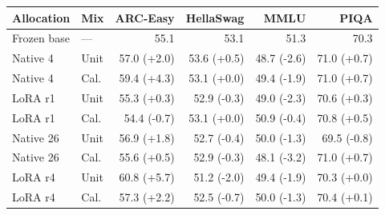 \begin{tabular}{@{}llrrrr@{}}
\toprule
Allocation & Mix & ARC-Easy & HellaSwag & MMLU & PIQA\\
\midrule
Frozen base & --- & 55.1 & 53.1 & 51.3 & 70.3\\
Native 4 & Unit & 57.0 (+2.0) & 53.6 (+0.5) & 48.7 (-2.6) & 71.0 (+0.7)\\
Native 4 & Cal. & 59.4 (+4.3) & 53.1 (+0.0) & 49.4 (-1.9) & 71.0 (+0.7)\\
LoRA r1 & Unit & 55.3 (+0.3) & 52.9 (-0.3) & 49.0 (-2.3) & 70.6 (+0.3)\\
LoRA r1 & Cal. & 54.4 (-0.7) & 53.1 (+0.0) & 50.9 (-0.4) & 70.8 (+0.5)\\
Native 26 & Unit & 56.9 (+1.8) & 52.7 (-0.4) & 50.0 (-1.3) & 69.5 (-0.8)\\
Native 26 & Cal. & 55.6 (+0.5) & 52.9 (-0.3) & 48.1 (-3.2) & 71.0 (+0.7)\\
LoRA r4 & Unit & 60.8 (+5.7) & 51.2 (-2.0) & 49.4 (-1.9) & 70.3 (+0.0)\\
LoRA r4 & Cal. & 57.3 (+2.2) & 52.5 (-0.7) & 50.0 (-1.3) & 70.4 (+0.1)\\
\bottomrule
\end{tabular}
